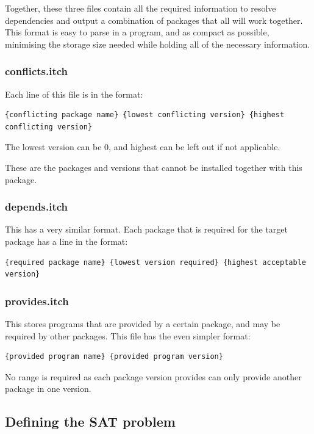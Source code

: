 \documentclass[10pt]{article}
\begin{document}
Together, these three files contain all the required information to resolve dependencies and output a combination of packages that all will work together. This format is easy to parse in a program, and as compact as possible, minimising the storage size needed while holding all of the necessary information.

\subsubsection{conflicts.itch}

Each line of this file is in the format:

\begin{lstlisting}
{conflicting package name} {lowest conflicting version} {highest conflicting version}
\end{lstlisting}

The lowest version can be 0, and highest can be left out if not applicable.

These are the packages and versions that cannot be installed together with this package.

\subsubsection{depends.itch}

This has a very similar format. Each package that is required for the target package has a line in the format:

\begin{lstlisting}
{required package name} {lowest version required} {highest acceptable version}
\end{lstlisting}

\subsubsection{provides.itch}

This stores programs that are provided by a certain package, and may be required by other packages. This file has the even simpler format:

\begin{lstlisting}
{provided program name} {provided program version}
\end{lstlisting}

No range is required as each package version provides can only provide another package in one version.

\subsection{Defining the SAT problem}
\end{document}
